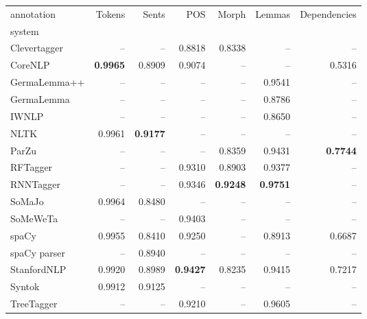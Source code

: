 \begin{tabular}{lrrrrrr}
\toprule
annotation &          Tokens &           Sents &             POS &           Morph &          Lemmas &    Dependencies \\
system       &                 &                 &                 &                 &                 &                 \\
\midrule
Clevertagger &              -- &              -- &          0.8818 &          0.8338 &              -- &              -- \\
CoreNLP      & \textbf{0.9965} &          0.8909 &          0.9074 &              -- &              -- &          0.5316 \\
GermaLemma++ &              -- &              -- &              -- &              -- &          0.9541 &              -- \\
GermaLemma   &              -- &              -- &              -- &              -- &          0.8786 &              -- \\
IWNLP        &              -- &              -- &              -- &              -- &          0.8650 &              -- \\
NLTK         &          0.9961 & \textbf{0.9177} &              -- &              -- &              -- &              -- \\
ParZu        &              -- &              -- &              -- &          0.8359 &          0.9431 & \textbf{0.7744} \\
RFTagger     &              -- &              -- &          0.9310 &          0.8903 &          0.9377 &              -- \\
RNNTagger    &              -- &              -- &          0.9346 & \textbf{0.9248} & \textbf{0.9751} &              -- \\
SoMaJo       &          0.9964 &          0.8480 &              -- &              -- &              -- &              -- \\
SoMeWeTa     &              -- &              -- &          0.9403 &              -- &              -- &              -- \\
spaCy        &          0.9955 &          0.8410 &          0.9250 &              -- &          0.8913 &          0.6687 \\
spaCy parser &              -- &          0.8940 &              -- &              -- &              -- &              -- \\
StanfordNLP  &          0.9920 &          0.8989 & \textbf{0.9427} &          0.8235 &          0.9415 &          0.7217 \\
Syntok       &          0.9912 &          0.9125 &              -- &              -- &              -- &              -- \\
TreeTagger   &              -- &              -- &          0.9210 &              -- &          0.9605 &              -- \\
\bottomrule
\end{tabular}

